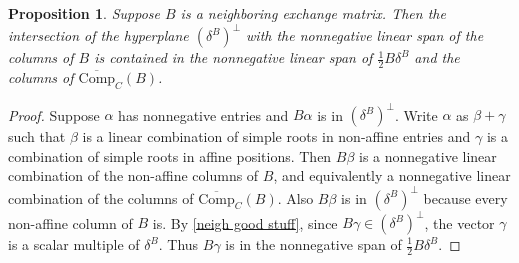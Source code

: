 \documentclass{amsart}
\newtheorem{proposition}{Proposition}[section]
\theoremstyle{definition}
\theoremstyle{remark}
\numberwithin{equation}{section}
\newcommand{\0}{{\mathbf{0}}}
\newcommand{\CompPlus}{\overline{\mathrm{Comp}}_C}
\begin{document}
\begin{proposition}\label{Comp span}
Suppose $B$ is a neighboring exchange matrix.
Then the intersection of the hyperplane $(\delta^B)^\perp$ with the nonnegative linear span of the columns of $B$ is contained in the nonnegative linear span of $\frac12B\delta^B$ and the columns of $\CompPlus(B)$.
\end{proposition}
\begin{proof}
Suppose $\alpha$ has nonnegative entries and $B\alpha$ is in $(\delta^B)^\perp$.
Write $\alpha$ as $\beta+\gamma$ such that $\beta$ is a linear combination of simple roots in non-affine entries and $\gamma$ is a combination of simple roots in affine positions.
Then $B\beta$ is a nonnegative linear combination of the non-affine columns of $B$, and equivalently a nonnegative linear combination of the columns of $\CompPlus(B)$.
Also $B\beta$ is in $(\delta^B)^\perp$ because every non-affine column of $B$ is.
By \cref{neigh good stuff}, since $B\gamma\in(\delta^B)^\perp$, the vector $\gamma$ is a scalar multiple of $\delta^B$.
Thus $B\gamma$ is in the nonnegative span of $\frac12B\delta^B$.
\end{proof}
\end{document}
